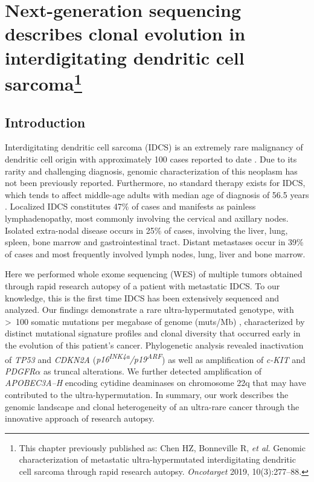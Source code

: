 \chapter[Next-generation sequencing describes clonal evolution in interdigitating dendritic cell sarcoma]{Next-generation sequencing describes clonal evolution in interdigitating dendritic cell sarcoma\footnote{This chapter previously published as: Chen HZ\cofirst, Bonneville R\cofirst, \textit{et al}. Genomic characterization of metastatic ultra-hypermutated interdigitating dendritic cell sarcoma through rapid research autopsy. \textit{Oncotarget} 2019, 10(3):277--88.}}
\label{ch:303}

\section{Introduction}
Interdigitating dendritic cell sarcoma (IDCS) is an extremely rare malignancy of dendritic cell origin with approximately 100 cases reported to date \cite{pokuri2015,xue2018}. Due to its rarity and challenging diagnosis, genomic characterization of this neoplasm has not been previously reported. Furthermore, no standard therapy exists for IDCS, which tends to affect middle-age adults with median age of diagnosis of 56.5 years \cite{saygin2013}. Localized IDCS constitutes 47\% of cases and manifests as painless lymphadenopathy, most commonly involving the cervical and axillary nodes. Isolated extra-nodal disease occurs in 25\% of cases, involving the liver, lung, spleen, bone marrow and gastrointestinal tract. Distant metastases occur in 39\% of cases and most frequently involved lymph nodes, lung, liver and bone marrow.

Here we performed whole exome sequencing (WES) of multiple tumors obtained through rapid research autopsy of a patient with metastatic IDCS. To our knowledge, this is the first time IDCS has been extensively sequenced and analyzed. Our findings demonstrate a rare ultra-hypermutated genotype, with \textgreater{}~100 somatic mutations per megabase of genome (muts/Mb) \cite{campbell2017}, characterized by distinct mutational signature profiles and clonal diversity that occurred early in the evolution of this patient's cancer. Phylogenetic analysis revealed inactivation of \textit{TP53} and \textit{CDKN2A} (\textit{p16\textsuperscript{INK4a}/p19\textsuperscript{ARF}}) as well as amplification of \textit{c-KIT} and \textit{PDGFR}$\mathit{\alpha}$ as truncal alterations. We further detected amplification of \textit{APOBEC3A--H} encoding cytidine deaminases on chromosome 22q that may have contributed to the ultra-hypermutation. In summary, our work describes the genomic landscape and clonal heterogeneity of an ultra-rare cancer through the innovative approach of research autopsy. 

